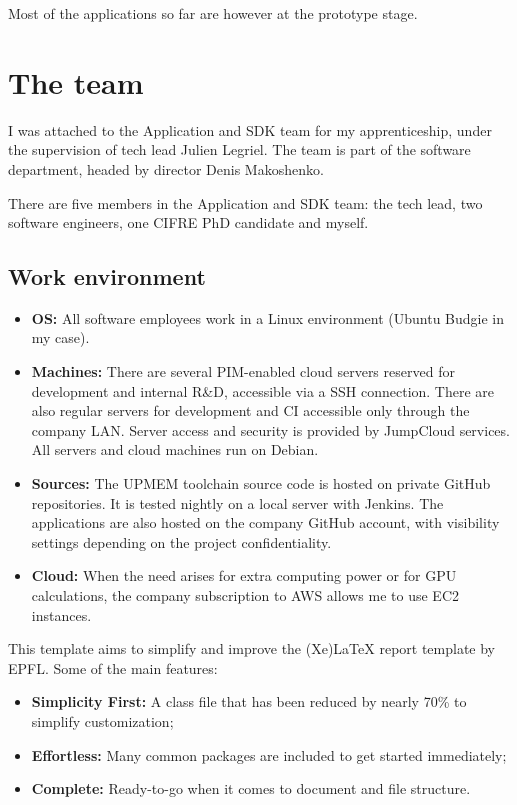 Most of the applications so far are however at the prototype stage.

\section{The team}
I was attached to the Application and SDK team for my apprenticeship, under the supervision of tech lead Julien Legriel. The team is part of the software department, headed by director Denis Makoshenko.

There are five members in the Application and SDK team: the tech lead, two software engineers, one CIFRE PhD candidate and myself.

\subsection{Work environment}
\begin{itemize}
    \item \textbf{OS:} All software employees work in a Linux environment (Ubuntu Budgie in my case).
    \item \textbf{Machines:} There are several PIM-enabled cloud servers reserved for development and internal R\&D, accessible via a SSH connection. There are also regular servers for development and CI accessible only through the company LAN. Server access and security is provided by JumpCloud services. All servers and cloud machines run on Debian.
    \item \textbf{Sources:} The UPMEM toolchain source code is hosted on private GitHub repositories. It is tested nightly on a local server with Jenkins. The applications are also hosted on the company GitHub account, with visibility settings depending on the project confidentiality.
    \item \textbf{Cloud:} When the need arises for extra computing power or for GPU calculations, the company subscription to AWS allows me to use EC2 instances.
\end{itemize}

This template aims to simplify and improve the (Xe)LaTeX report template by EPFL. Some of the main features:

\begin{itemize}
  \item \textbf{Simplicity First:} A class file that has been reduced by nearly 70\% to simplify customization;
  \item \textbf{Effortless:} Many common packages are included to get started immediately;
  \item \textbf{Complete:} Ready-to-go when it comes to document and file structure.
\end{itemize}

